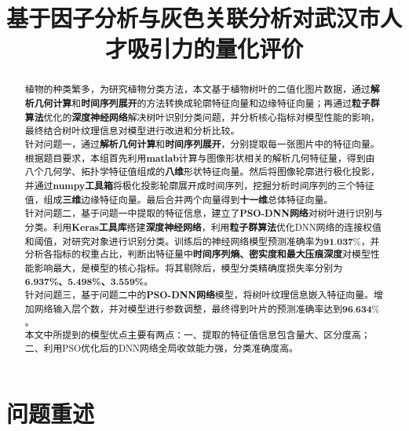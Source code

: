 \documentclass{whutmod}
\title{基于因子分析与灰色关联分析对武汉市人才吸引力的量化评价}
\begin{document}
	
	\begin{abstract}

植物的种类繁多，为研究植物分类方法，本文基于植物树叶的二值化图片数据，通过\textbf{解析几何计算}和\textbf{时间序列展开}的方法转换成轮廓特征向量和边缘特征向量；再通过\textbf{粒子群算法}优化的\textbf{深度神经网络}解决树叶识别分类问题，并分析核心指标对模型性能的影响，最终结合树叶纹理信息对模型进行改进和分析比较。
~\\

针对问题一，通过\textbf{解析几何计算}和\textbf{时间序列展开}，分别提取每一张图片中的特征向量。根据题目要求，本组首先利用\textbf{matlab}计算与图像形状相关的解析几何特征量，得到由八个几何学、拓扑学特征值组成的\textbf{八维}形状特征向量。然后将图像轮廓进行极化投影，并通过\textbf{numpy工具箱}将极化投影轮廓展开成时间序列，挖掘分析时间序列的三个特征值，组成\textbf{三维}边缘特征向量。最后合并两个向量得到\textbf{十一维}总体特征向量。~\\


针对问题二，基于问题一中提取的特征信息，建立了\textbf{PSO-DNN网络}对树叶进行识别与分类。利用\textbf{Keras工具库}搭建\textbf{深度神经网络}，利用\textbf{粒子群算法}优化DNN网络的连接权值和阈值，对研究对象进行识别分类。训练后的神经网络模型预测准确率为$\textbf{91.037\%}$，并分析各指标的权重占比，判断出特征量中\textbf{时间序列熵、密实度和最大压痕深度}对模型性能影响最大，是模型的核心指标。将其剔除后，模型分类精确度损失率分别为\textbf{6.937\%、5.498\%、3.559\%}。
~\\

针对问题三，基于问题二中的\textbf{PSO-DNN网络}模型，将树叶纹理信息嵌入特征向量。增加网络输入层个数，并对模型进行参数调整，最终得到叶片的预测准确率达到$\textbf{96.634\%}$。
~\\

本文中所提到的模型优点主要有两点：一、提取的特征值信息包含量大、区分度高；二、利用PSO优化后的DNN网络全局收敛能力强，分类准确度高。

	
  
		
	\end{abstract}
	
	\tableofcontents
	\newpage	%
	
	\section{问题重述}	
\end{document}
